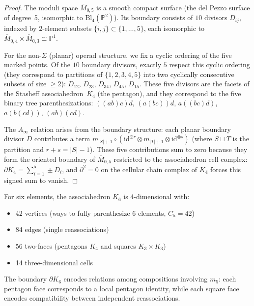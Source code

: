 \begin{proof}
The moduli space $\overline{M}_{0,5}$ is a smooth compact surface
(the del Pezzo surface of degree~5, isomorphic to
$\mathrm{Bl}_4(\mathbb{P}^2)$). Its boundary consists of $10$
divisors $D_{ij}$, indexed by $2$-element subsets $\{i,j\} \subset
\{1,\ldots,5\}$, each isomorphic to $\overline{M}_{0,4} \times
\overline{M}_{0,3} \cong \mathbb{P}^1$.

For the non-$\Sigma$ (planar) operad structure, we fix a cyclic ordering
of the five marked points. Of the $10$ boundary divisors, exactly $5$
respect this cyclic ordering (they correspond to partitions of
$\{1,2,3,4,5\}$ into two cyclically consecutive subsets of size
$\geq 2$): $D_{12}$, $D_{23}$, $D_{34}$, $D_{45}$, $D_{15}$.
These five divisors are the facets of the Stasheff associahedron~$K_4$
(the pentagon), and they correspond to the five binary tree
parenthesizations:
$((ab)c)d$, $(a(bc))d$, $a((bc)d)$, $a(b(cd))$, $(ab)(cd)$.

The $A_\infty$ relation arises from the boundary structure: each
planar boundary divisor $D$ contributes a term
$m_{|S|+1} \circ (\mathrm{id}^{\otimes r} \otimes m_{|T|+1}
\otimes \mathrm{id}^{\otimes s})$ (where $S \sqcup T$ is the
partition and $r + s = |S| - 1$). These five contributions sum
to zero because they form the oriented boundary of $\overline{M}_{0,5}$
restricted to the associahedron cell complex:
$\partial K_4 = \sum_{i=1}^5 \pm D_i$, and $\partial^2 = 0$ on
the cellular chain complex of $K_4$ forces this signed sum to vanish.
\end{proof}

\begin{theorem}\label{thm:higher-associahedron-m5}
For six elements, the associahedron $K_6$ is 4-dimensional with:
\begin{itemize}
\item 42 vertices (ways to fully parenthesize 6 elements, $C_5 = 42$)
\item 84 edges (single reassociations)
\item 56 two-faces (pentagons $K_4$ and squares $K_3 \times K_3$)
\item 14 three-dimensional cells
\end{itemize}

The boundary $\partial K_6$ encodes relations among compositions involving $m_5$: each pentagon face corresponds to a local pentagon identity, while each square face encodes compatibility between independent reassociations.
\end{theorem}


